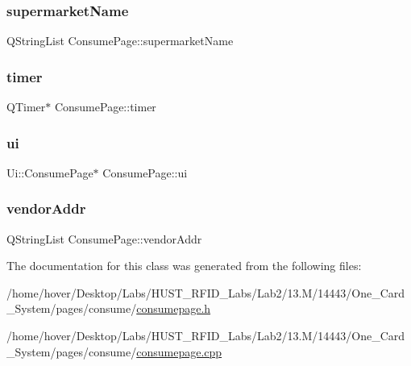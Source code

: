 \subsubsection{\texorpdfstring{supermarketName}{supermarketName}}
{\footnotesize\ttfamily Q\+String\+List Consume\+Page\+::supermarket\+Name\hspace{0.3cm}{\ttfamily [private]}}

\mbox{\label{class_consume_page_a2d862691698552503b8874e7b6ab6d78}} 
\subsubsection{\texorpdfstring{timer}{timer}}
{\footnotesize\ttfamily Q\+Timer$\ast$ Consume\+Page\+::timer\hspace{0.3cm}{\ttfamily [private]}}

\mbox{\label{class_consume_page_a985f62c214ee04ab5a32826a2c01670a}} 
\subsubsection{\texorpdfstring{ui}{ui}}
{\footnotesize\ttfamily Ui\+::\+Consume\+Page$\ast$ Consume\+Page\+::ui\hspace{0.3cm}{\ttfamily [private]}}

\mbox{\label{class_consume_page_afbdd27b55a3286494a4b5b460d7f76f6}} 
\subsubsection{\texorpdfstring{vendorAddr}{vendorAddr}}
{\footnotesize\ttfamily Q\+String\+List Consume\+Page\+::vendor\+Addr\hspace{0.3cm}{\ttfamily [private]}}



The documentation for this class was generated from the following files\+:\begin{DoxyCompactItemize}
\item 
/home/hover/\+Desktop/\+Labs/\+H\+U\+S\+T\+\_\+\+R\+F\+I\+D\+\_\+\+Labs/\+Lab2/13.\+M/14443/\+One\+\_\+\+Card\+\_\+\+System/pages/consume/\mbox{\hyperlink{consumepage_8h}{consumepage.\+h}}\item 
/home/hover/\+Desktop/\+Labs/\+H\+U\+S\+T\+\_\+\+R\+F\+I\+D\+\_\+\+Labs/\+Lab2/13.\+M/14443/\+One\+\_\+\+Card\+\_\+\+System/pages/consume/\mbox{\hyperlink{consumepage_8cpp}{consumepage.\+cpp}}\end{DoxyCompactItemize}
